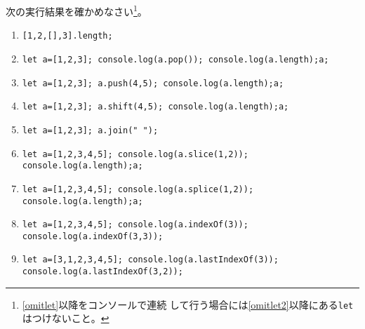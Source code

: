\begin{Prob}\upshape
 次の実行結果を確かめなさい\footnote{\ref{omitlet}以降をコンソールで連続
 して行う場合には\ref{omitlet2}以降にある\texttt{let}はつけないこと。}。
\begin{enumerate}\upshape
 \item \texttt{[1,2,[],3].length;}
 \item \texttt{let a=[1,2,3]; console.log(a.pop());
       console.log(a.length);a;}\label{omitlet}
 \item \texttt{let a=[1,2,3]; a.push(4,5); console.log(a.length);a;}\label{omitlet2}
 \item \texttt{let a=[1,2,3]; a.shift(4,5); console.log(a.length);a;}
 \item \texttt{let a=[1,2,3]; a.join(" ");}
 \item \texttt{let a=[1,2,3,4,5]; console.log(a.slice(1,2)); console.log(a.length);a;}
 \item \texttt{let a=[1,2,3,4,5]; console.log(a.splice(1,2)); console.log(a.length);a;}
 \item \texttt{let a=[1,2,3,4,5]; console.log(a.indexOf(3)); console.log(a.indexOf(3,3));}
 \item \texttt{let a=[3,1,2,3,4,5]; console.log(a.lastIndexOf(3));
       console.log(a.lastIndexOf(3,2));}%
\end{enumerate}
\end{Prob}
